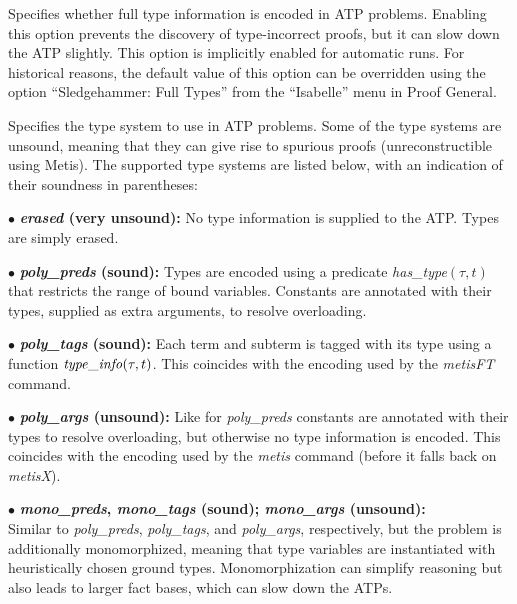 \documentclass[a4paper,12pt]{article}
\begin{document}
\begin{enum}
Specifies whether full type information is encoded in ATP problems. Enabling
this option prevents the discovery of type-incorrect proofs, but it can slow
down the ATP slightly. This option is implicitly enabled for automatic runs. For
historical reasons, the default value of this option can be overridden using the
option ``Sledgehammer: Full Types'' from the ``Isabelle'' menu in Proof General.

Specifies the type system to use in ATP problems. Some of the type systems are
unsound, meaning that they can give rise to spurious proofs (unreconstructible
using Metis). The supported type systems are listed below, with an indication of
their soundness in parentheses:

\begin{enum}
\item[$\bullet$] \textbf{\textit{erased} (very unsound):} No type information is
supplied to the ATP. Types are simply erased.

\item[$\bullet$] \textbf{\textit{poly\_preds} (sound):} Types are encoded using
a predicate \textit{has\_\allowbreak type\/}$(\tau, t)$ that restricts the range
of bound variables. Constants are annotated with their types, supplied as extra
arguments, to resolve overloading.

\item[$\bullet$] \textbf{\textit{poly\_tags} (sound):} Each term and subterm is
tagged with its type using a function $\mathit{type\_info\/}(\tau, t)$. This
coincides with the encoding used by the \textit{metisFT} command.

\item[$\bullet$] \textbf{\textit{poly\_args} (unsound):}
Like for \textit{poly\_preds} constants are annotated with their types to
resolve overloading, but otherwise no type information is encoded. This
coincides with the encoding used by the \textit{metis} command (before it falls
back on \textit{metisX}).

\item[$\bullet$]
\textbf{%
\textit{mono\_preds}, \textit{mono\_tags} (sound);
\textit{mono\_args} (unsound):} \\
Similar to \textit{poly\_preds}, \textit{poly\_tags}, and \textit{poly\_args},
respectively, but the problem is additionally monomorphized, meaning that type
variables are instantiated with heuristically chosen ground types.
Monomorphization can simplify reasoning but also leads to larger fact bases,
which can slow down the ATPs.


\end{enum}
\end{enum}
\end{document}
